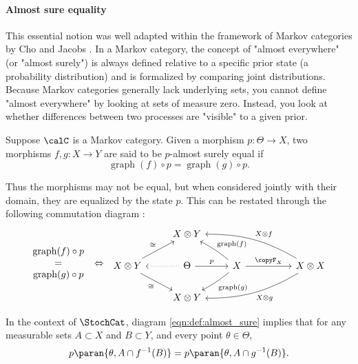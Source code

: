 \documentclass[12pt,oneside,pb-diagram]{article}
\DeclareMathOperator{\graph}{graph}
\begin{document}
\paragraph{Almost sure equality}  This essential notion was well adapted within the framework of Markov categories by Cho and Jacobs \cite[Def 5.1]{ChoJacobs2019disintegr}. In a Markov category, the concept of "almost everywhere" (or "almost surely") is always defined relative to a specific prior state (a probability distribution) and is formalized by comparing joint distributions. Because Markov categories generally lack underlying sets, you cannot define "almost everywhere" by looking at sets of measure zero. Instead, you look at whether differences between two processes are "visible" to a given prior.

\begin{definition} 
	Suppose $\calC$ is a Markov category. Given a morphism $p : \Theta \to X$, two morphisms $f,g : X \to Y$ are said to be $p$-almost surely equal if 
	\[ \graph(f) \circ p = \graph(g) \circ p. \]
\end{definition}

Thus the morphisms may not be equal, but when considered jointly with their domain, they are equalized by the state $p$. This can be restated through the following commutation diagram :
%
\begin{equation} \label{eqn:def:almost_sure}
	\begin{array}{c} \graph(f) \circ p  \\ = \\ \graph(g) \circ p \end{array}
	\;\Leftrightarrow\;
	\begin{tikzcd}
		& X\otimes Y \\
		X\otimes Y \arrow[dr, "\cong"'] \arrow[ur, "\cong"] & \Theta \arrow[l, dotted] \arrow[r, "p"] & X \arrow[ul, bend right=5, "\graph(f)"'] \arrow[dl, bend left=5, "\graph(g)"] \arrow[rr, "\copyF_X"] && X \otimes X \arrow[ulll, bend right=15, "X\otimes f"'] \arrow[dlll, bend left=15, "X\otimes g"] \\
		& X\otimes Y
	\end{tikzcd}
\end{equation}
%

\begin{Erg}{}{} 
	In the context of $\StochCat$, diagram \eqref{eqn:def:almost_sure} implies that for any measurable sets $A\subset X$ and $B\subset Y$, and every point $\theta\in \Theta$,
	\[ p\paran{ \theta, A \cap f^{-1}(B) } = p\paran{ \theta, A \cap g^{-1}(B) } . \]
\end{Erg}
\end{document}
